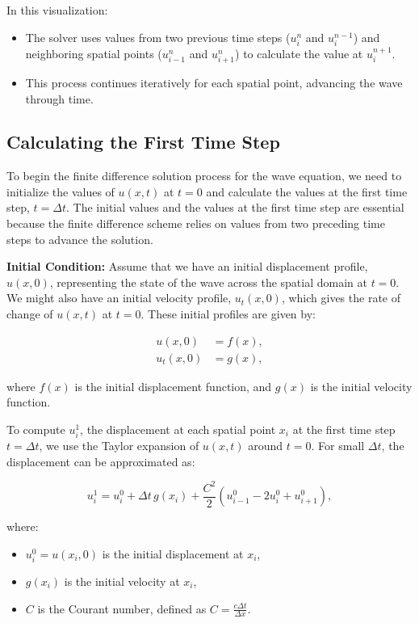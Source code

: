 \documentclass{article}
\begin{document}
		In this visualization:
		\begin{itemize}
			\item The solver uses values from two previous time steps ($u_i^n$ and $u_i^{n-1}$) and neighboring spatial points ($u_{i-1}^n$ and $u_{i+1}^n$) to calculate the value at $u_i^{n+1}$.
			\item This process continues iteratively for each spatial point, advancing the wave through time.
		\end{itemize}
		
		\subsection{Calculating the First Time Step}
		
		To begin the finite difference solution process for the wave equation, we need to initialize the values of $u(x, t)$ at $t = 0$ and calculate the values at the first time step, $t = \Delta t$. The initial values and the values at the first time step are essential because the finite difference scheme relies on values from two preceding time steps to advance the solution.
		
		\textbf{Initial Condition:} Assume that we have an initial displacement profile, $u(x,0)$, representing the state of the wave across the spatial domain at $t = 0$. We might also have an initial velocity profile, $u_t(x,0)$, which gives the rate of change of $u(x,t)$ at $t = 0$. These initial profiles are given by:
		
		\begin{align}
			u(x,0) &= f(x), \\
			u_t(x,0) &= g(x),
		\end{align}
		
		where $f(x)$ is the initial displacement function, and $g(x)$ is the initial velocity function.
		
		To compute $u_i^1$, the displacement at each spatial point $x_i$ at the first time step $t = \Delta t$, we use the Taylor expansion of $u(x,t)$ around $t=0$. For small $\Delta t$, the displacement can be approximated as:
		
		\begin{equation}
			u_i^1 = u_i^0 + \Delta t \, g(x_i) + \frac{C^2}{2} \left( u_{i-1}^0 - 2u_i^0 + u_{i+1}^0 \right),
		\end{equation}
		
		where:
		\begin{itemize}
			\item $u_i^0 = u(x_i, 0)$ is the initial displacement at $x_i$,
			\item $g(x_i)$ is the initial velocity at $x_i$,
			\item $C$ is the Courant number, defined as $C = \frac{c \Delta t}{\Delta x}$.
		\end{itemize}
		
\end{document}
